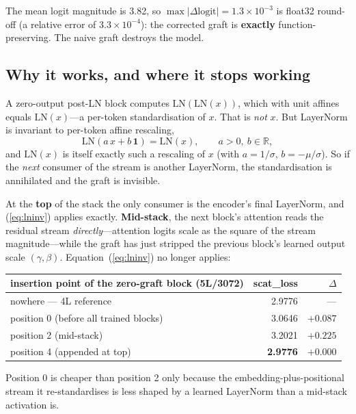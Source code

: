 \documentclass[11pt,a4paper]{article}
\begin{document}
The mean logit magnitude is 3.82, so $\max|\Delta\text{logit}| = 1.3\times10^{-3}$ is float32
round-off (a relative error of $3.3\times10^{-4}$): the corrected graft is \textbf{exactly} function-preserving. The naive graft
destroys the model.

\subsection{Why it works, and where it stops working}

A zero-output post-LN block computes $\mathrm{LN}(\mathrm{LN}(x))$, which with unit affines
equals $\mathrm{LN}(x)$---a per-token standardisation of $x$. That is \emph{not} $x$. But
LayerNorm is invariant to per-token affine rescaling,
\begin{equation}
\mathrm{LN}(a\,x + b\,\mathbf{1}) = \mathrm{LN}(x), \qquad a > 0,\ b \in \mathbb{R},
\label{eq:lninv}
\end{equation}
and $\mathrm{LN}(x)$ is itself exactly such a rescaling of $x$ (with $a = 1/\sigma$,
$b = -\mu/\sigma$). So if the \emph{next} consumer of the stream is another LayerNorm, the
standardisation is annihilated and the graft is invisible.

At the \textbf{top} of the stack the only consumer is the encoder's final LayerNorm, and
(\ref{eq:lninv}) applies exactly. \textbf{Mid-stack}, the next block's attention reads the
residual stream \emph{directly}---attention logits scale as the square of the stream
magnitude---while the graft has just stripped the previous block's learned output scale
$(\gamma,\beta)$. Equation~(\ref{eq:lninv}) no longer applies:

\begin{center}\small
\begin{tabular}{lrr}
\toprule
insertion point of the zero-graft block (5L/3072) & scat\_loss & $\Delta$ \\
\midrule
nowhere --- 4L reference                    & 2.9776 & --- \\
position 0 (before all trained blocks)      & 3.0646 & $+0.087$ \\
position 2 (mid-stack)                      & 3.2021 & $+0.225$ \\
position 4 (appended at top)                & \textbf{2.9776} & $\mathbf{+0.000}$ \\
\bottomrule
\end{tabular}
\end{center}

Position 0 is cheaper than position 2 only because the embedding-plus-positional stream it
re-standardises is less shaped by a learned LayerNorm than a mid-stack activation is.
\end{document}
